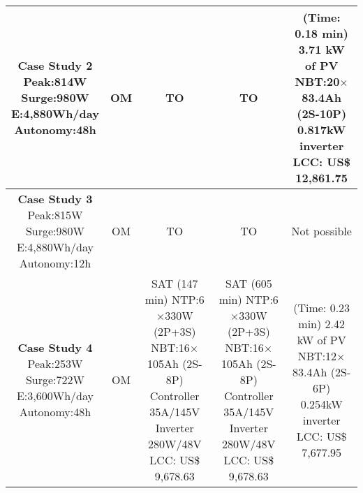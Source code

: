 \begin{table}
\begin{scriptsize}
\begin{tabular}{c|c|c|c|c}
\hline
\makecell{\textbf{Case Study 2}\\Peak:814W\\Surge:980W\\E:4,880Wh/day\\Autonomy:48h} & OM & TO & TO & \makecell{(Time: 0.18 min)\\3.71 kW of PV\\NBT:20$\times$83.4Ah (2S-10P)\\0.817kW inverter\\LCC: US\$ 12,861.75} \\
\hline
\makecell{\textbf{Case Study 3}\\Peak:815W\\Surge:980W\\E:4,880Wh/day\\Autonomy:12h} & OM & TO & TO & Not possible \\
\hline
\makecell{\textbf{Case Study 4}\\Peak:253W\\Surge:722W\\E:3,600Wh/day\\Autonomy:48h} & OM & \makecell{SAT (147 min) \\NTP:6$\times$330W (2P+3S)\\NBT:16$\times$105Ah (2S-8P)\\Controller 35A/145V\\Inverter 280W/48V\\LCC: US\$ 9,678.63} & \makecell{SAT (605 min) \\NTP:6$\times$330W (2P+3S)\\NBT:16$\times$105Ah (2S-8P)\\Controller 35A/145V\\Inverter 280W/48V\\LCC: US\$ 9,678.63} & \makecell{(Time: 0.23 min)\\2.42 kW of PV\\NBT:12$\times$83.4Ah (2S-6P)\\0.254kW inverter\\LCC: US\$ 7,677.95}\\
\hline

\end{tabular}
\end{scriptsize}
\end{table}
